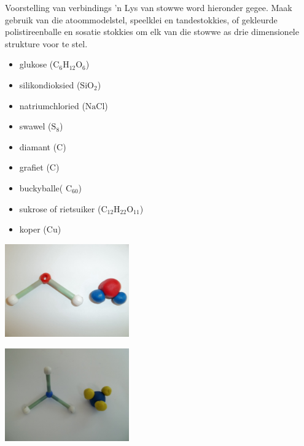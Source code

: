 \begin{activity}{Voorstelling van verbindings}
'n Lys van stowwe word hieronder gegee. Maak gebruik van die atoommodelstel, speelklei en tandestokkies, of gekleurde polistireenballe en sosatie stokkies om elk van die stowwe as drie dimensionele strukture voor te stel.\\
\begin{minipage}{.4\textwidth}
\begin{itemize}
 \item glukose ($\text{C}_{6}\text{H}_{12}\text{O}_{6}$)
\item silikondioksied ($\text{SiO}_{2}$)
\item natriumchloried ($\text{NaCl}$)
\item swawel ($\text{S}_{8}$)
\item diamant ($\text{C}$)
\item grafiet ($\text{C}$)
\item buckyballe( $\text{C}_{60}$)
\item sukrose of rietsuiker ($\text{C}_{12}\text{H}_{22}\text{O}_{11}$)
\item koper ($\text{Cu}$)
\end{itemize}
\end{minipage}
\begin{minipage}{.6\textwidth}
\begin{center}
\includegraphics[width=0.4\textwidth]{photos/water.jpg}
\end{center}  
\begin{center}
\includegraphics[width=0.4\textwidth]{photos/ammonia.jpg}
\end{center}
\end{minipage}
\end{activity}
